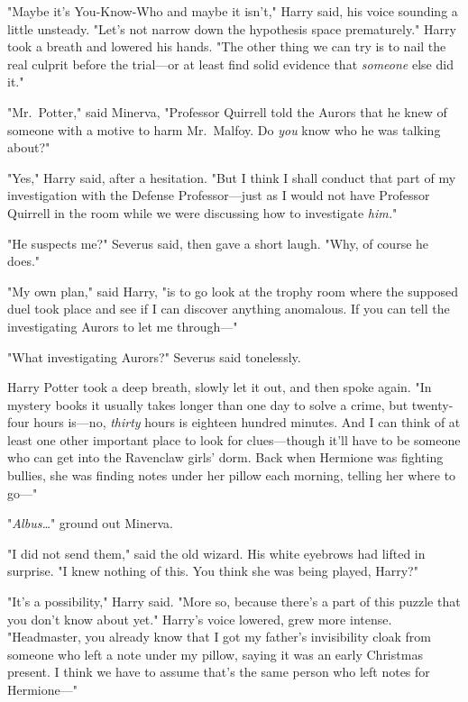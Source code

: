 "Maybe it's You-Know-Who and maybe it isn't," Harry said, his voice sounding a 
little unsteady. "Let's not narrow down the hypothesis space prematurely." 
Harry took a breath and lowered his hands. "The other thing we can try is to 
nail the real culprit before the trial---or at least find solid evidence that 
\emph{someone} else did it."

"Mr.~Potter," said Minerva, "Professor Quirrell told the Aurors that he knew of 
someone with a motive to harm Mr.~Malfoy. Do \emph{you} know who he was talking 
about?"

"Yes," Harry said, after a hesitation. "But I think I shall conduct that part 
of my investigation with the Defense Professor---just as I would not have 
Professor Quirrell in the room while we were discussing how to investigate 
\emph{him.}"

"He suspects me?" Severus said, then gave a short laugh. "Why, of course he 
does."

"My own plan," said Harry, "is to go look at the trophy room where the supposed 
duel took place and see if I can discover anything anomalous. If you can tell 
the investigating Aurors to let me through---"

"What investigating Aurors?" Severus said tonelessly.

Harry Potter took a deep breath, slowly let it out, and then spoke again. "In 
mystery books it usually takes longer than one day to solve a crime, but 
twenty-four hours is---no, \emph{thirty} hours is eighteen hundred minutes. And 
I can think of at least one other important place to look for clues---though 
it'll have to be someone who can get into the Ravenclaw girls' dorm. Back when 
Hermione was fighting bullies, she was finding notes under her pillow each 
morning, telling her where to go---"

"\emph{Albus{\ldots}}" ground out Minerva.

"I did not send them," said the old wizard. His white eyebrows had lifted in 
surprise. "I knew nothing of this. You think she was being played, Harry?"

"It's a possibility," Harry said. "More so, because there's a part of this 
puzzle that you don't know about yet." Harry's voice lowered, grew more 
intense. "Headmaster, you already know that I got my father's invisibility 
cloak from someone who left a note under my pillow, saying it was an early 
Christmas present. I think we have to assume that's the same person who left 
notes for Hermione---"

